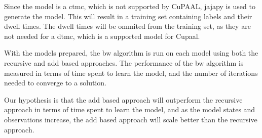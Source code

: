 Since the model is a \gls{ctmc}, which is not supported by CuPAAL, jajapy is used to generate the model.
This will result in a training set containing labels and their dwell times.
The dwell times will be ommited from the training set, as they are not needed for a \gls{dtmc}, which is a supported model for Cupaal.

With the models prepared, the \gls{bw} algorithm is run on each model using both the recursive and \gls{add} based approaches.
The performance of the \gls{bw} algorithm is measured in terms of time spent to learn the model, and the number of iterations needed to converge to a solution.

Our hypothesis is that the \gls{add} based approach will outperform the recursive approach in terms of time spent to learn the model, and as the model states and observations increase, the \gls{add} based approach will scale better than the recursive approach.



